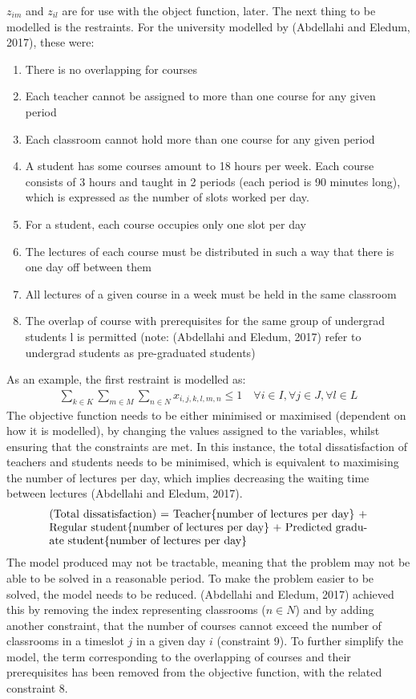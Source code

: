 \documentclass[a4paper, 12pt]{report}
\begin{document}
\( z_{im} \) and \( z_{il} \) are for use with the object function, later. The
next thing to be modelled is the restraints. For the university modelled by
(Abdellahi and Eledum, 2017), these were:

\begin{enumerate}
	\item There is no overlapping for courses
	\item Each teacher cannot be assigned to more than one course for any given
		period
	\item Each classroom cannot hold more than one course for any given period
	\item A student has some courses amount to 18 hours per week. Each course
		consists of 3 hours and taught in 2 periods (each period is 90 minutes
		long), which is expressed as the number of slots worked per day.
	\item For a student, each course occupies only one slot per day
	\item The lectures of each course must be distributed in such a way that
		there is one day off between them
	\item All lectures of a given course in a week must be held in the same
		classroom
	\item The overlap of course with prerequisites for the same group of
		undergrad students l is permitted (note: (Abdellahi and Eledum, 2017)
		refer to undergrad students as pre-graduated students)
\end{enumerate}

As an example, the first restraint is modelled as:
\begin{align*}
	\sum_{k \in K} \sum_{m \in M} \sum_{n \in N} x_{i,j,k,l,m,n} \leq 1 \quad
	\forall i \in I, \forall j \in J, \forall l \in L
\end{align*}
The objective function needs to be either minimised or maximised (dependent on
how it is modelled), by changing the values assigned to the variables, whilst
ensuring that the constraints are met.
In this instance, the total dissatisfaction of teachers and students needs to be
minimised, which is equivalent to maximising the number of lectures per day,
which implies decreasing the waiting time between lectures (Abdellahi and
Eledum, 2017).
\begin{align*}
	\parbox[t]{10cm}{(Total dissatisfaction) = Teacher\{number of lectures per
	day\} + Regular student\{number of lectures per day\} + Predicted graduate
	student\{number of lectures per day\}}
\end{align*}
The model produced may not be tractable, meaning that the problem may not be
able to be solved in a reasonable period.
To make the problem easier to be solved, the model needs to be reduced.
(Abdellahi and Eledum, 2017) achieved this by removing the index representing
classrooms (\( n\in N \)) and by adding another constraint, that the number of
courses cannot exceed the number of classrooms in a timeslot \( j \) in a given
day \( i \) (constraint 9).
To further simplify the model, the term corresponding to the overlapping of
courses and their prerequisites has been removed from the objective function,
with the related constraint 8.
\end{document}
